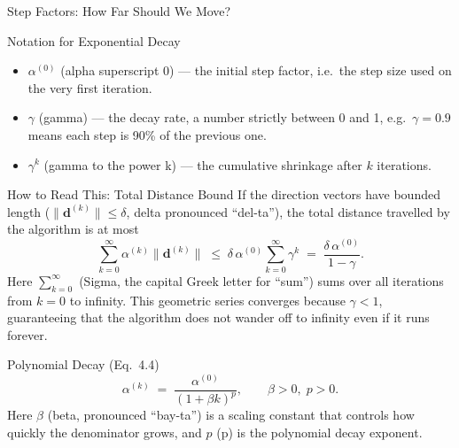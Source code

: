 \documentclass[aspectratio=169,10pt]{beamer}
\newcommand{\bd}{\mathbf{d}}
\begin{document}
\begin{frame}[allowframebreaks]{Step Factors: How Far Should We Move?}
  \begin{block}{Notation for Exponential Decay}
    \begin{itemize}
      \item $\alpha^{(0)}$ (alpha superscript 0) --- the initial step
            factor, i.e.\ the step size used on the very first iteration.
      \item $\gamma$ (gamma) --- the decay rate, a number strictly between
            0 and 1, e.g.\ $\gamma = 0.9$ means each step is 90\% of
            the previous one.
      \item $\gamma^k$ (gamma to the power k) --- the cumulative
            shrinkage after $k$ iterations.
    \end{itemize}
  \end{block}

  \begin{alertblock}{How to Read This: Total Distance Bound}
    If the direction vectors have bounded length ($\|\bd^{(k)}\| \le
    \delta$, delta pronounced ``del-ta''), the total distance travelled
    by the algorithm is at most
    \[
      \sum_{k=0}^{\infty} \alpha^{(k)} \|\bd^{(k)}\|
      \;\le\;
      \delta\, \alpha^{(0)} \sum_{k=0}^{\infty} \gamma^k
      \;=\;
      \frac{\delta\, \alpha^{(0)}}{1 - \gamma}.
    \]
    Here $\sum_{k=0}^{\infty}$ (Sigma, the capital Greek letter for
    ``sum'') sums over all iterations from $k=0$ to infinity.  This
    geometric series converges because $\gamma < 1$, guaranteeing that
    the algorithm does not wander off to infinity even if it runs forever.
  \end{alertblock}

  \framebreak

  \begin{block}{Polynomial Decay (Eq.\ 4.4)}
    \[
      \alpha^{(k)} \;=\; \frac{\alpha^{(0)}}{(1 + \beta k)^p},
      \qquad \beta > 0,\; p > 0.
    \]
    Here $\beta$ (beta, pronounced ``bay-ta'') is a scaling constant that
    controls how quickly the denominator grows, and $p$ (p) is the
    polynomial decay exponent.
  \end{block}


\end{frame}
\end{document}

